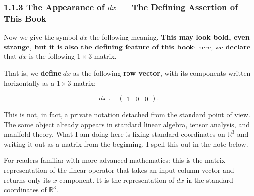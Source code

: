 \documentclass[a4paper,12pt,openany]{book}
\begin{document}
\clearpage

\hypertarget{the-appearance-of-dx-the-defining-assertion-of-this-book}{%
\subsubsection{\texorpdfstring{1.1.3 The Appearance of \(dx\) — The
Defining Assertion of This
Book}{1.1.3 The Appearance of dx — The Defining Assertion of This Book}}\label{the-appearance-of-dx-the-defining-assertion-of-this-book}}

Now we give the symbol \(dx\) the following meaning.
\textbf{This may look bold, even strange, but it is also the defining feature of this book}:
here, we \textbf{declare} that \(dx\) is the following \(1\times3\)
matrix.

That is, we \textbf{define} \(dx\) as the following \textbf{row vector},
with its components written horizontally as a \(1\times3\) matrix:

\[
dx := \begin{pmatrix} 1 & 0 & 0 \end{pmatrix}.
\]

This is not, in fact, a private notation detached from the standard
point of view. The same object already appears in standard linear
algebra, tensor analysis, and manifold theory. What I am doing here is
fixing standard coordinates on \(\mathbb{R}^3\) and writing it out as a
matrix from the beginning. I spell this out in the note below.

For readers familiar with more advanced mathematics: this is the matrix
representation of the linear operator that takes an input column vector
and returns only its \(x\)-component. It is the representation of \(dx\)
in the standard coordinates of \(\mathbb{R}^3\).
\end{document}
